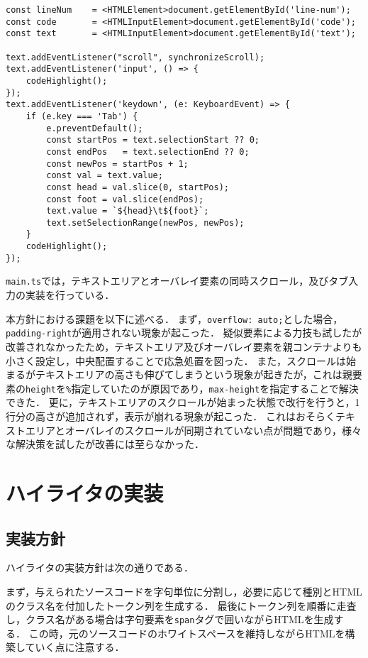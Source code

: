 \documentclass[autodetect-engine,dvi=dvipdfmx,ja=standard,
               a4j,11pt]{bxjsarticle}
\begin{document}
\begin{lstlisting}[caption={{\tt main.ts(コンテンツ制御部抜粋)}(オーバレイ)}, label={prog:overlay-ts}]
const lineNum    = <HTMLElement>document.getElementById('line-num');
const code       = <HTMLInputElement>document.getElementById('code');
const text       = <HTMLInputElement>document.getElementById('text');

text.addEventListener("scroll", synchronizeScroll);
text.addEventListener('input', () => {
    codeHighlight();
});
text.addEventListener('keydown', (e: KeyboardEvent) => {
    if (e.key === 'Tab') {
        e.preventDefault();
        const startPos = text.selectionStart ?? 0;
        const endPos   = text.selectionEnd ?? 0;
        const newPos = startPos + 1;
        const val = text.value;
        const head = val.slice(0, startPos);
        const foot = val.slice(endPos);
        text.value = `${head}\t${foot}`;
        text.setSelectionRange(newPos, newPos);
    }
    codeHighlight();
});
\end{lstlisting}

\verb|main.ts|では，テキストエリアとオーバレイ要素の同時スクロール，及びタブ入力の実装を行っている．

本方針における課題を以下に述べる．
まず，\verb|overflow: auto;|とした場合，\verb|padding-right|が適用されない現象が起こった．
疑似要素による力技も試したが改善されなかったため，テキストエリア及びオーバレイ要素を親コンテナよりも小さく設定し，中央配置することで応急処置を図った．
また，スクロールは始まるがテキストエリアの高さも伸びてしまうという現象が起きたが，これは親要素の\verb|height|を\verb|%|指定していたのが原因であり，\verb|max-height|を指定することで解決できた．
更に，テキストエリアのスクロールが始まった状態で改行を行うと，1行分の高さが追加されず，表示が崩れる現象が起こった．
これはおそらくテキストエリアとオーバレイのスクロールが同期されていない点が問題であり，様々な解決策を試したが改善には至らなかった．

\section{ハイライタの実装}

\subsection{実装方針}

ハイライタの実装方針は次の通りである．

まず，与えられたソースコードを字句単位に分割し，必要に応じて種別とHTMLのクラス名を付加したトークン列を生成する．
最後にトークン列を順番に走査し，クラス名がある場合は字句要素を\verb|span|タグで囲いながらHTMLを生成する．
この時，元のソースコードのホワイトスペースを維持しながらHTMLを構築していく点に注意する．
\end{document}
